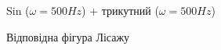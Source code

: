 \begin{figure}[h]
\begin{minipage}[h]{0.47\linewidth}
	\end{minipage}
	\vfill
	\begin{minipage}[h]{0.47\linewidth}
		 Sin ($\omega=500 Hz$) + трикутний ($\omega=500 Hz$) \\
	\end{minipage}
	\hfill
	\begin{minipage}[h]{0.47\linewidth}
		 Відповідна фігура Лісажу \\

\end{minipage}
\end{figure}
